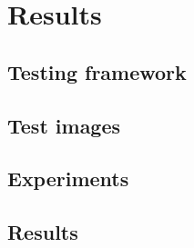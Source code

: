 \chapter{Results} 

\label{ch:Results} 

\section{Testing framework}
\section{Test images}
\section{Experiments}
\section{Results}
